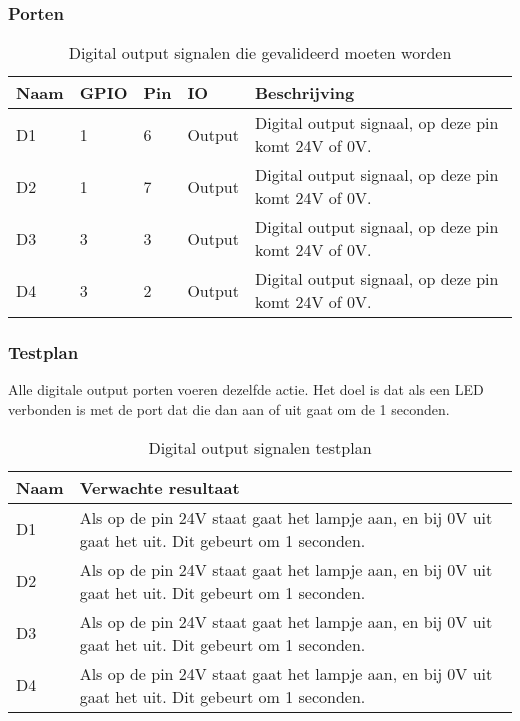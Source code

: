 \subsubsection{Porten}
\begin{table}[h!]
	\caption{Digital output signalen die gevalideerd moeten worden}
	\begin{tabular}{llllp{10cm}}
	\toprule
	\textbf{Naam} & \textbf{GPIO} & \textbf{Pin} & \textbf{IO} & \textbf{Beschrijving}				 	\\ \toprule
	D1			& 1			& 6    	& Output	& Digital output signaal, op deze pin komt 24V of 0V. \\
	D2			& 1			& 7    	& Output	& Digital output signaal, op deze pin komt 24V of 0V. \\
	D3			& 3			& 3    	& Output	& Digital output signaal, op deze pin komt 24V of 0V. \\
	D4			& 3			& 2   	& Output	& Digital output signaal, op deze pin komt 24V of 0V. \\ \bottomrule
	\end{tabular}
	\label{tab:hw_val_dio}
\end{table}

\subsubsection{Testplan}
Alle digitale output porten voeren dezelfde actie. Het doel is dat als een LED verbonden is met de port dat die dan aan of uit gaat om de 1 seconden.
\begin{table}[h!]
	\caption{Digital output signalen testplan}
	\begin{tabular}{lp{14.5cm}}
	\toprule
	\textbf{Naam} 	& \textbf{Verwachte resultaat} \\ \toprule
	D1	&	Als op de pin 24V staat gaat het lampje aan, en bij 0V uit gaat het uit. Dit gebeurt om 1 seconden. \\			
	D2	&	Als op de pin 24V staat gaat het lampje aan, en bij 0V uit gaat het uit. Dit gebeurt om 1 seconden. \\			
	D3	&	Als op de pin 24V staat gaat het lampje aan, en bij 0V uit gaat het uit. Dit gebeurt om 1 seconden. \\			
	D4	&	Als op de pin 24V staat gaat het lampje aan, en bij 0V uit gaat het uit. Dit gebeurt om 1 seconden. \\ \bottomrule
	\end{tabular}
	\label{tab:hw_val_dio_testplan}
\end{table}

